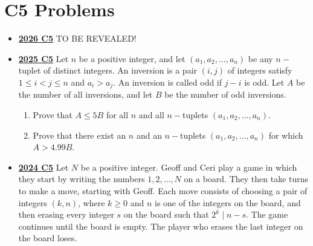 \documentclass[11pt]{scrartcl}
\begin{document}
\section*{C5 Problems} \label{C5}
\begin{itemize}[leftmargin=*]


\item \href{https://www.imo-official.org/assets/documents/problems/2026/IMO2026SL.pdf}{\textbf{2026 C5}} TO BE REVEALED!

\item \href{https://artofproblemsolving.com/community/c6h3866870p38676985}{\textbf{2025 C5}} Let $n$ be a positive integer, and let $(a_1,a_2,\dots,a_n)$ be any $n-$tuplet of distinct integers. An inversion is a pair $(i,j)$ of integers satisfy $1 \leqslant i < j \leqslant n$ and $a_i > a_j$. An inversion is called odd if $j-i$ is odd. Let $A$ be the number of all inversions, and let $B$ be the number of odd inversions.
\begin{enumerate}[leftmargin=*]
\item[(a)] Prove that $A \leqslant 5B$ for all $n$ and all $n-$tuplets $(a_1,a_2,\dots,a_n)$.
\item[(b)] Prove that there exist an $n$ and an $n-$tuplets $(a_1,a_2,\dots,a_n)$ for which $A> 4.99B$.
\end{enumerate}


\item \href{https://artofproblemsolving.com/community/c6h3610469p35340978}{\textbf{2024 C5}} Let $N$ be a positive integer. Geoff and Ceri play a game in which they start by writing the numbers $1, 2, \dots, N$ on a board. They then take turns to make a move, starting with Geoff. Each move consists of choosing a pair of integers $(k, n)$, where $k \geqslant  0$ and $n$ is one of the integers on the board, and then erasing every integer $s$ on the board such that $2^k \mid n - s$. The game continues until the board is empty. The player who erases the last integer on the board loses.


\end{itemize}
\end{document}
